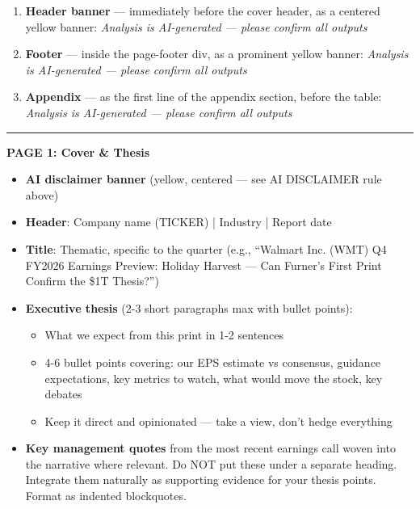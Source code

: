\documentclass[11pt]{article}
\begin{document}
\begin{enumerate}[leftmargin=*,itemsep=2pt,topsep=2pt]
\item {} \textbf{Header banner} — immediately before the cover header, as a centered yellow banner: \emph{Analysis is AI-generated — please confirm all outputs}
\item {} \textbf{Footer} — inside the page-footer div, as a prominent yellow banner: \emph{Analysis is AI-generated — please confirm all outputs}
\item {} \textbf{Appendix} — as the first line of the appendix section, before the table: \emph{Analysis is AI-generated — please confirm all outputs}
\end{enumerate}

\vspace{0.5em}\hrule\vspace{0.5em}

\textbf{PAGE 1: Cover \& Thesis}


\begin{itemize}[leftmargin=*,itemsep=2pt,topsep=2pt]
\item {} \textbf{AI disclaimer banner} (yellow, centered — see AI DISCLAIMER rule above)
\item {} \textbf{Header}: Company name (TICKER) | Industry | Report date
\item {} \textbf{Title}: Thematic, specific to the quarter (e.g., ``Walmart Inc. (WMT) Q4 FY2026 Earnings Preview: Holiday Harvest — Can Furner's First Print Confirm the \$1T Thesis?'')
\item {} \textbf{Executive thesis} (2-3 short paragraphs max with bullet points):
\begin{itemize}[leftmargin=*,itemsep=2pt,topsep=2pt]
\item {} What we expect from this print in 1-2 sentences
\item {} 4-6 bullet points covering: our EPS estimate vs consensus, guidance expectations, key metrics to watch, what would move the stock, key debates
\item {} Keep it direct and opinionated — take a view, don't hedge everything
\end{itemize}
\item {} \textbf{Key management quotes} from the most recent earnings call woven into the narrative where relevant. Do NOT put these under a separate heading. Integrate them naturally as supporting evidence for your thesis points. Format as indented blockquotes.
\end{itemize}
\end{document}
